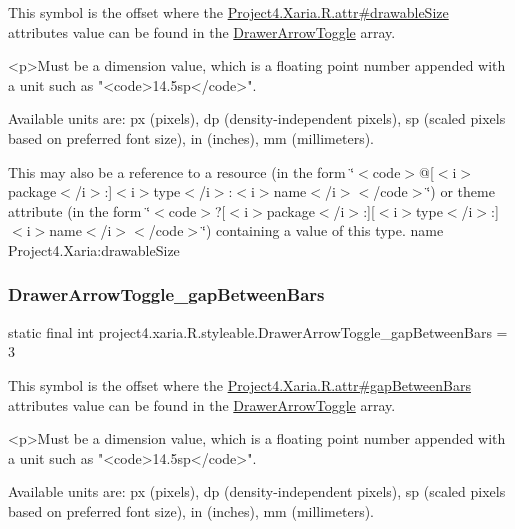 This symbol is the offset where the \hyperlink{}{Project4.\+Xaria.\+R.\+attr\#drawable\+Size} attribute\textquotesingle{}s value can be found in the \hyperlink{classproject4_1_1xaria_1_1R_1_1styleable_aa8594da8de0b2617c3d5cd5e028f8b77}{Drawer\+Arrow\+Toggle} array.

\begin{DoxyVerb}      <p>Must be a dimension value, which is a floating point number appended with a unit such as "<code>14.5sp</code>".
\end{DoxyVerb}
 Available units are\+: px (pixels), dp (density-\/independent pixels), sp (scaled pixels based on preferred font size), in (inches), mm (millimeters). 

This may also be a reference to a resource (in the form \char`\"{}$<$code$>$@\mbox{[}$<$i$>$package$<$/i$>$\+:\mbox{]}$<$i$>$type$<$/i$>$\+:$<$i$>$name$<$/i$>$$<$/code$>$\char`\"{}) or theme attribute (in the form \char`\"{}$<$code$>$?\mbox{[}$<$i$>$package$<$/i$>$\+:\mbox{]}\mbox{[}$<$i$>$type$<$/i$>$\+:\mbox{]}$<$i$>$name$<$/i$>$$<$/code$>$\char`\"{}) containing a value of this type.  name Project4.\+Xaria\+:drawable\+Size \mbox{\label{classproject4_1_1xaria_1_1R_1_1styleable_a8d472cd739b04305b3402c6232122cb4}} 
\subsubsection{\texorpdfstring{Drawer\+Arrow\+Toggle\+\_\+gap\+Between\+Bars}{DrawerArrowToggle\_gapBetweenBars}}
{\footnotesize\ttfamily static final int project4.\+xaria.\+R.\+styleable.\+Drawer\+Arrow\+Toggle\+\_\+gap\+Between\+Bars = 3\hspace{0.3cm}{\ttfamily [static]}}

This symbol is the offset where the \hyperlink{}{Project4.\+Xaria.\+R.\+attr\#gap\+Between\+Bars} attribute\textquotesingle{}s value can be found in the \hyperlink{classproject4_1_1xaria_1_1R_1_1styleable_aa8594da8de0b2617c3d5cd5e028f8b77}{Drawer\+Arrow\+Toggle} array.

\begin{DoxyVerb}      <p>Must be a dimension value, which is a floating point number appended with a unit such as "<code>14.5sp</code>".
\end{DoxyVerb}
 Available units are\+: px (pixels), dp (density-\/independent pixels), sp (scaled pixels based on preferred font size), in (inches), mm (millimeters). 

